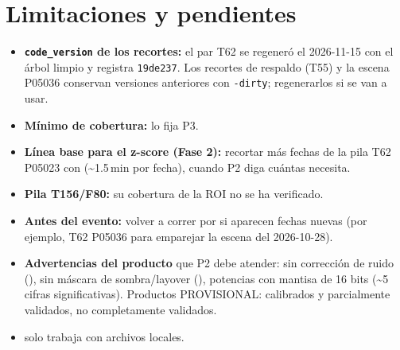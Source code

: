 \documentclass[11pt,a4paper]{article}
\begin{document}
\section{Limitaciones y pendientes}

\begin{itemize}
  \item \textbf{\texttt{code\_version} de los recortes:} el par T62 se regeneró el 2026-11-15 con el árbol limpio y registra \texttt{19de237}.
        Los recortes de respaldo (T55) y la escena P05036 conservan versiones anteriores con \texttt{-dirty}; regenerarlos si se van a usar.
  \item \textbf{Mínimo de cobertura:} lo fija P3.
  \item \textbf{Línea base para el z-score (Fase 2):} recortar más fechas de la pila T62 P05023 con 
        (\textasciitilde 1.5\,min por fecha), cuando P2 diga cuántas necesita.
  \item \textbf{Pila T156/F80:} su cobertura de la ROI no se ha verificado.
  \item \textbf{Antes del evento:} volver a correr  por si aparecen fechas nuevas (por ejemplo, T62 P05036 para
        emparejar la escena del 2026-10-28).
  \item \textbf{Advertencias del producto} que P2 debe atender: sin corrección de ruido (), sin
        máscara de sombra/layover (), potencias con mantisa de 16 bits (\textasciitilde 5 cifras
        significativas). Productos PROVISIONAL: calibrados y parcialmente validados, no completamente validados.
  \item {} solo trabaja con archivos locales.
\end{itemize}
\end{document}

